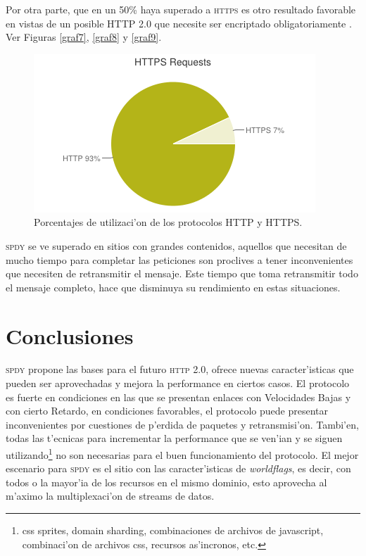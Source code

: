 \documentclass[a4paper,11pt,twocolumn]{article}
\begin{document}
Por otra parte, que en un 50\% haya superado a \textsc{https} es otro resultado favorable en vistas de un posible HTTP 2.0 \cite{http2} que necesite ser encriptado obligatoriamente \cite{art1http2} \cite{art2http2} \cite{art3http2}. Ver Figuras \ref{graf7}, \ref{graf8} y \ref{graf9}.

\begin{figure}[h]
  	\centering
	\includegraphics[scale=0.53]{httpvshttps}
	\caption{\small Porcentajes de utilizaci'on de los protocolos HTTP y HTTPS.}
	\label{httpvsthhps}
\end{figure}

\textsc{spdy} se ve superado en sitios con grandes contenidos, aquellos que necesitan de mucho tiempo para completar las peticiones son proclives a tener inconvenientes que necesiten de retransmitir el mensaje. Este tiempo que toma retransmitir todo el mensaje completo, hace que disminuya su rendimiento en estas situaciones.

\section{Conclusiones}

\textsc{spdy} propone las bases para el futuro \textsc{http 2.0}, ofrece nuevas caracter'isticas que pueden ser aprovechadas y mejora la performance en ciertos casos. El protocolo es fuerte en condiciones en las que se presentan enlaces con Velocidades Bajas y con cierto Retardo, en condiciones favorables, el protocolo puede presentar inconvenientes por cuestiones de p'erdida de paquetes y retransmisi'on. Tambi'en, todas las t'ecnicas para incrementar la performance que se ven'ian y se siguen utilizando\footnote{css sprites, domain sharding, combinaciones de archivos de javascript, combinaci'on de archivos css, recursos as'incronos, etc.} no son necesarias para el buen funcionamiento del protocolo. El mejor escenario para \textsc{spdy} es el sitio con las caracter'isticas de \emph{worldflags}, es decir, con todos o la mayor'ia de los recursos en el mismo dominio, esto aprovecha al m'aximo la multiplexaci'on de streams de datos.
\end{document}
